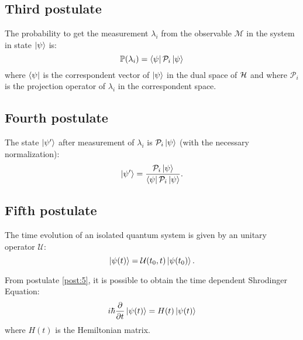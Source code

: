     \subsection{Third postulate}
    \begin{postulate}
        The probability to get the measurement $\lambda_i$ from the observable 
        $\mathcal{M}$ in the system in state $\ket{\psi}$ is:
        \begin{equation*}
            \mathbb{P}(\lambda_i)=\bra{\psi}\mathcal{P}_i\ket{\psi}
        \end{equation*}
        where $\bra{\psi}$ is the correspondent vector of $\ket{\psi}$ in the 
        dual space of $\mathcal{H}$ and where $\mathcal{P}_i$ is the projection operator
        of $\lambda_i$ in the correspondent space.
        \label{post:3}
    \end{postulate}

    \subsection{Fourth postulate}
    \begin{postulate}
        The state $\ket{\psi'}$ after measurement of $\lambda_i$ is $\mathcal{P}_i\ket{\psi}$ (with the
        necessary normalization):
        \begin{equation*}
            \ket{\psi'}=\frac{\mathcal{P}_i\ket{\psi}}{\bra{\psi}\mathcal{P}_i\ket{\psi}}.
        \end{equation*}
        \label{post:4}
    \end{postulate}

    \subsection{Fifth postulate}
    \begin{postulate}
        The time evolution of an isolated quantum system is given by an unitary operator
        $\mathcal{U}$:
        \begin{equation*}
            \ket{\psi(t)}=\mathcal{U}(t_0,t)\ket{\psi(t_0)}.
        \end{equation*}
        \label{post:5}
    \end{postulate}
    \begin{observation*}
        From postulate \ref{post:5}, it is possible to obtain the time dependent Shrodinger Equation:
        \begin{equation*}
            i\hbar\partialderivative{}{t}\ket{\psi(t)}=H(t)\ket{\psi(t)}
        \end{equation*}
        where $H(t)$ is the Hemiltonian matrix.
    \end{observation*}

